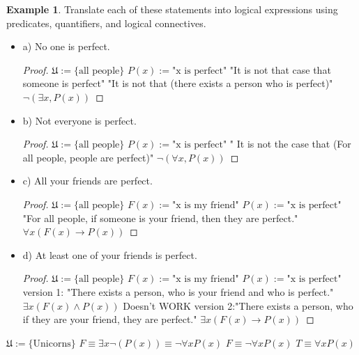 \documentclass[letterpaper,10pt]{article}
\theoremstyle{plain}
\theoremstyle{definition}
\newtheorem{exmp}[thm]{Example}
\theoremstyle{remark}
\providecommand{\land}{\ensuremath{\wedge}}
\begin{document}
\begin{exmp}
Translate each of these statements into logical expressions
using predicates, quantifiers, and logical connectives.
\begin{itemize}
\item a) No one is perfect.
\begin{proof}
$\mathfrak{U}:=\{\text{all people}\}$ 
\newline
$P(x):=\text{"x is perfect"}$
\newline
"It is not that case that someone is perfect"
\newline
"It is not that (there exists a person who is perfect)"
\newline
$\lnot(\exists x, P(x)) $
\end{proof}
\item b) Not everyone is perfect.
\begin{proof}
$\mathfrak{U}:=\{\text{all people}\}$ 
\newline
$P(x):=\text{"x is perfect"}$
\newline
" It is not the case that (For all people, people are perfect)"
\newline
$\lnot(\forall x, P(x)) $
\end{proof}
\item c) All your friends are perfect.
\begin{proof}
$\mathfrak{U}:=\{\text{all people}\}$ 
\newline
$F(x):=\text{"x is my friend"}$
\newline
$P(x):=\text{"x is perfect"}$
\newline
"For all people, if someone is your friend, then they are perfect."
\newline
$\forall x ( F(x) \to P(x) ) $
\end{proof}
\item d) At least one of your friends is perfect.
\begin{proof}
$\mathfrak{U}:=\{\text{all people}\}$ 
\newline
$F(x):=\text{"x is my friend"}$
\newline
$P(x):=\text{"x is perfect"}$
\newline
version 1:
\newline
"There exists a person, who is your friend and who is perfect."
\newline
$\exists x (F(x) \land P(x)) $
\newline
Doesn't WORK
\newline
version 2:"There exists a person, who if they are your friend, they are perfect."
\newline
$\exists x (F(x) \to P(x)) $
\end{proof}
\end{itemize}
\end{exmp}
$\mathfrak{U}:=\{\text{Unicorns}\}$
\newline
$F\equiv\exists x \lnot (P(x))\equiv \lnot \forall x P(x)$
\newline
$F\equiv\lnot \forall x P(x)$
\newline
$T\equiv \forall x P(x)$
\end{document}
